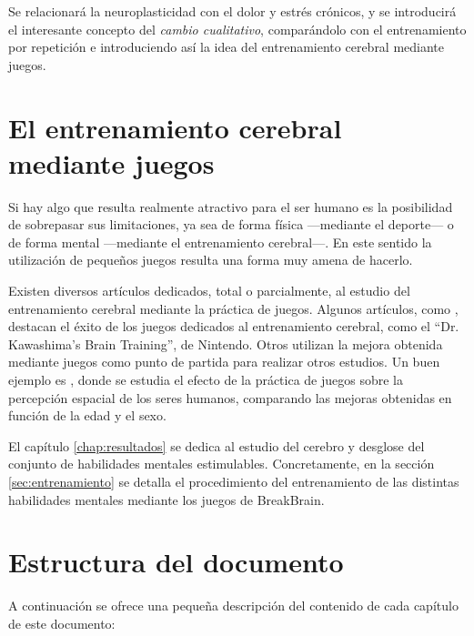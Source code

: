 Se relacionará la neuroplasticidad con el dolor y estrés crónicos, y se introducirá el interesante concepto del {\it cambio cualitativo}, comparándolo con el entrenamiento por repetición e introduciendo así la idea del entrenamiento cerebral mediante juegos.

\section{El entrenamiento cerebral mediante juegos}

Si hay algo que resulta realmente atractivo para el ser humano es la posibilidad de sobrepasar sus limitaciones, ya sea de forma física ---mediante el deporte--- o de forma mental ---mediante el entrenamiento cerebral---. En este sentido la utilización de pequeños juegos resulta una forma muy amena de hacerlo.

Existen diversos artículos dedicados, total o parcialmente, al estudio del entrenamiento cerebral mediante la práctica de juegos. Algunos artículos, como \cite{Hackley2011}, destacan el éxito de los juegos dedicados al entrenamiento cerebral, como el ``Dr. Kawashima's Brain Training'', de Nintendo. Otros utilizan la mejora obtenida mediante juegos como punto de partida para realizar otros estudios. Un buen ejemplo es \cite{Hirvasoja2004}, donde se estudia el efecto de la práctica de juegos sobre la percepción espacial de los seres humanos, comparando las mejoras obtenidas en función de la edad y el sexo.

El capítulo \ref{chap:resultados} se dedica al estudio del cerebro y desglose del conjunto de habilidades mentales estimulables. Concretamente, en la sección \ref{sec:entrenamiento} se detalla el procedimiento del entrenamiento de las distintas habilidades mentales mediante los juegos de BreakBrain.

\section{Estructura del documento}

A continuación se ofrece una pequeña descripción del contenido de cada capítulo de este documento:

